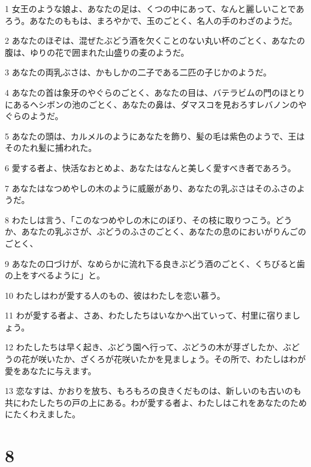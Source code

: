 \par 1 女王のような娘よ、あなたの足は、くつの中にあって、なんと麗しいことであろう。あなたのももは、まろやかで、玉のごとく、名人の手のわざのようだ。
\par 2 あなたのほぞは、混ぜたぶどう酒を欠くことのない丸い杯のごとく、あなたの腹は、ゆりの花で囲まれた山盛りの麦のようだ。
\par 3 あなたの両乳ぶさは、かもしかの二子である二匹の子じかのようだ。
\par 4 あなたの首は象牙のやぐらのごとく、あなたの目は、バテラビムの門のほとりにあるヘシボンの池のごとく、あなたの鼻は、ダマスコを見おろすレバノンのやぐらのようだ。
\par 5 あなたの頭は、カルメルのようにあなたを飾り、髪の毛は紫色のようで、王はそのたれ髪に捕われた。
\par 6 愛する者よ、快活なおとめよ、あなたはなんと美しく愛すべき者であろう。
\par 7 あなたはなつめやしの木のように威厳があり、あなたの乳ぶさはそのふさのようだ。
\par 8 わたしは言う、「このなつめやしの木にのぼり、その枝に取りつこう。どうか、あなたの乳ぶさが、ぶどうのふさのごとく、あなたの息のにおいがりんごのごとく、
\par 9 あなたの口づけが、なめらかに流れ下る良きぶどう酒のごとく、くちびると歯の上をすべるように」と。
\par 10 わたしはわが愛する人のもの、彼はわたしを恋い慕う。
\par 11 わが愛する者よ、さあ、わたしたちはいなかへ出ていって、村里に宿りましょう。
\par 12 わたしたちは早く起き、ぶどう園へ行って、ぶどうの木が芽ざしたか、ぶどうの花が咲いたか、ざくろが花咲いたかを見ましょう。その所で、わたしはわが愛をあなたに与えます。
\par 13 恋なすは、かおりを放ち、もろもろの良きくだものは、新しいのも古いのも共にわたしたちの戸の上にある。わが愛する者よ、わたしはこれをあなたのためにたくわえました。

\chapter{8}

